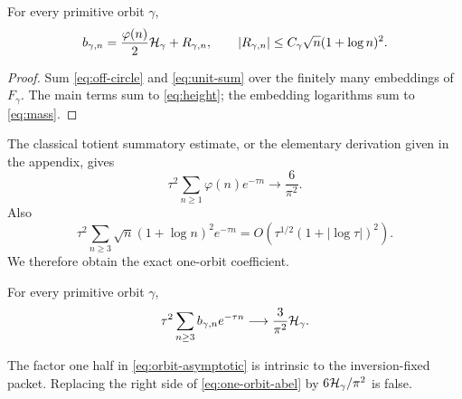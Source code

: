 \begin{theorem}
For every primitive orbit $\gamma$,
\begin{equation}
 b_{\gamma,n}
 =\frac{\varphi(n)}2\mathcal H_\gamma+R_{\gamma,n},
 \qquad
 |R_{\gamma,n}|
 \le C_\gamma\sqrt n(1+\log n)^2.
 \label{eq:orbit-asymptotic}
\end{equation}
\end{theorem}

\begin{proof}
Sum \eqref{eq:off-circle} and \eqref{eq:unit-sum} over the finitely many
embeddings of $F_\gamma$.  The main terms sum to \eqref{eq:height}; the
embedding logarithms sum to \eqref{eq:mass}.
\end{proof}

The classical totient summatory estimate, or the elementary derivation
given in the appendix, gives
\begin{equation}
 \tau^2\sum_{n\ge1}\varphi(n)e^{-\tau n}
 \longrightarrow\frac6{\pi^2}.
 \label{eq:totient-laplace}
\end{equation}
Also
\[
 \tau^2\sum_{n\ge3}\sqrt n(1+\log n)^2e^{-\tau n}
 =O\!\left(\tau^{1/2}(1+|\log\tau|)^2\right).
\]
We therefore obtain the exact one-orbit coefficient.

\begin{corollary}
\label{cor:one-orbit-abel}
For every primitive orbit $\gamma$,
\begin{equation}
 \tau^2\sum_{n\ge3}b_{\gamma,n}e^{-\tau n}
 \longrightarrow\frac3{\pi^2}\mathcal H_\gamma.
 \label{eq:one-orbit-abel}
\end{equation}
\end{corollary}

The factor one half in \eqref{eq:orbit-asymptotic} is intrinsic to the
inversion-fixed packet.  Replacing the right side of
\eqref{eq:one-orbit-abel} by $6\mathcal H_\gamma/\pi^2$ is false.
